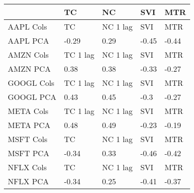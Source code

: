 \begin{tabular}{lllll}
\toprule
{} &        TC &        NC &   SVI &   MTR \\
\midrule
AAPL Cols  &        TC &  NC 1 lag &   SVI &   MTR \\
AAPL PCA   &     -0.29 &      0.29 & -0.45 & -0.44 \\
AMZN Cols  &  TC 1 lag &  NC 1 lag &   SVI &   MTR \\
AMZN PCA   &      0.38 &      0.38 & -0.33 & -0.27 \\
GOOGL Cols &  TC 1 lag &  NC 1 lag &   SVI &   MTR \\
GOOGL PCA  &      0.43 &      0.45 &  -0.3 & -0.27 \\
META Cols  &  TC 1 lag &  NC 1 lag &   SVI &   MTR \\
META PCA   &      0.48 &      0.49 & -0.23 & -0.19 \\
MSFT Cols  &        TC &  NC 1 lag &   SVI &   MTR \\
MSFT PCA   &     -0.34 &      0.33 & -0.46 & -0.42 \\
NFLX Cols  &        TC &  NC 1 lag &   SVI &   MTR \\
NFLX PCA   &     -0.34 &      0.25 & -0.41 & -0.37 \\
\bottomrule
\end{tabular}
